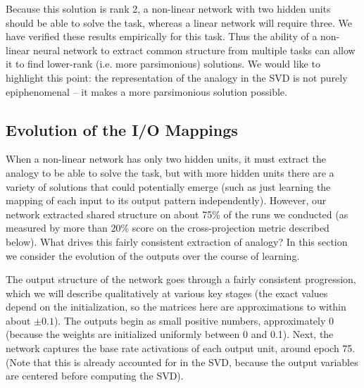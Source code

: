 \documentclass[10pt,letterpaper]{article}
\begin{document}
Because this solution is rank 2, a non-linear network with two hidden units should be able to solve the task, whereas a linear network will require three. We have verified these results empirically for this task. Thus the ability of a non-linear neural network to extract common structure from multiple tasks can allow it to find lower-rank (i.e. more parsimonious) solutions. We would like to highlight this point: the representation of the analogy in the SVD is not purely epiphenomenal -- it makes a more parsimonious solution possible. \par
\subsection{Evolution of the I/O Mappings}
%
When a non-linear network has only two hidden units, it must extract the analogy to be able to solve the task, but with more hidden units there are a variety of solutions that could potentially emerge (such as just learning the mapping of each input to its output pattern independently). However, our network extracted shared structure on about 75\% of the runs we conducted (as measured by more than 20\% score on the cross-projection metric described below). What drives this fairly consistent extraction of analogy? In this section we consider the evolution of the outputs over the course of learning. \par 
The output structure of the network goes through a fairly consistent progression, which we will describe qualitatively at various key stages (the exact values depend on the initialization, so the matrices here are approximations to within about \(\pm 0.1\)). The outputs begin as small positive numbers, approximately 0 (because the weights are initialized uniformly between 0 and 0.1). Next, the network captures the base rate activations of each output unit, around epoch 75. (Note that this is already accounted for in the SVD, because the output variables are centered before computing the SVD). \par
\end{document}
